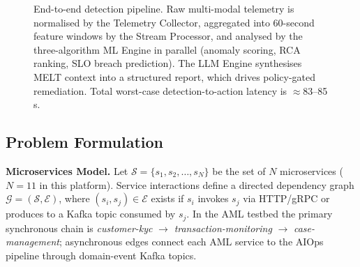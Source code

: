 \documentclass[a4paper]{lipics-v2021}
\newcommand{\mypara}[1]{{\vspace{0.1mm}\noindent\textbf{#1}}}
\begin{document}
\begin{figure}[t]
{%
}
\caption{End-to-end detection pipeline. Raw multi-modal telemetry is normalised by
the Telemetry Collector, aggregated into 60-second feature windows by the Stream
Processor, and analysed by the three-algorithm ML Engine in parallel (anomaly
scoring, RCA ranking, SLO breach prediction). The LLM Engine synthesises MELT
context into a structured report, which drives policy-gated remediation. Total
worst-case detection-to-action latency is $\approx$83--85\,s.}
\label{fig:pipeline}
\end{figure}


\subsection{Problem Formulation}

\mypara{Microservices Model.}
Let $\mathcal{S} = \{s_1, s_2, \ldots, s_N\}$ be the set of $N$ microservices
($N{=}11$ in this platform). Service interactions define a directed dependency graph
$\mathcal{G} = (\mathcal{S}, \mathcal{E})$, where $(s_i, s_j) \in \mathcal{E}$
exists if $s_i$ invokes $s_j$ via HTTP/gRPC or produces to a Kafka topic consumed by
$s_j$. In the AML testbed the primary synchronous chain is
\textit{customer-kyc} $\to$ \textit{transaction-monitoring} $\to$
\textit{case-management}; asynchronous edges connect each AML service to the AIOps
pipeline through domain-event Kafka topics.
\end{document}
